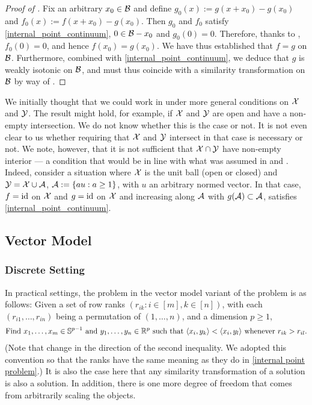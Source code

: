 \documentclass[twoside, 11pt]{article}
\begin{document}
\begin{proof}[Proof of ]
Fix an arbitrary $x_0 \in \mathcal{B}$ and define $g_0(x) := g(x+x_0)-g(x_0)$ and $f_0(x) := f(x+x_0)-g(x_0)$. Then $g_0$ and $f_0$ satisfy \eqref{internal_point_continuum}, $0 \in \mathcal{B} - x_0$ and $g_0(0) = 0$. Therefore, thanks to , $f_0(0) = 0$, and hence $f(x_0) = g(x_0)$. 
We have thus established that $f = g$ on $\mathcal{B}$. Furthermore, combined with \eqref{internal_point_continuum}, we deduce that $g$ is weakly isotonic on $\mathcal{B}$,  and must thus coincide with a similarity transformation on $\mathcal{B}$ by way of . 
\end{proof}

We initially thought that we could work in  under more general conditions on $\mathcal{X}$ and $\mathcal{Y}$. The result might hold, for example, if $\mathcal{X}$ and $\mathcal{Y}$ are open and have a non-empty intersection. We do not know whether this is the case or not. It is not even clear to us whether requiring that $\mathcal{X}$ and $\mathcal{Y}$ intersect in that case is necessary or not. 
We note, however, that it is not sufficient that $\mathcal{X} \cap \mathcal{Y}$ have non-empty interior --- a condition that would be in line with what was assumed in  and . Indeed, consider a situation where $\mathcal{X}$ is the unit ball (open or closed) and $\mathcal{Y} = \mathcal{X} \cup \mathcal{A}$, $\mathcal{A} := \{a u : a \ge 1\}$, with $u$ an arbitrary normed vector. In that case, $f = {\rm id}$ on $\mathcal{X}$ and $g = {\rm id}$ on $\mathcal{X}$ and increasing along $\mathcal{A}$ with $g(\mathcal{A}) \subset \mathcal{A}$, satisfies \eqref{internal_point_continuum}.



\subsection{Vector Model}
\label{sec:internal_vector}

\subsubsection{Discrete Setting}
\label{sec:internal vector discrete}

In practical settings, the problem in the vector model variant of the problem is as follows: 
Given a set of row ranks $(r_{ik} : i \in [m], k \in [n])$, with each $(r_{i1}, \dots, r_{in})$ being a permutation of $(1, \dots, n)$, and a dimension $p \ge 1$, 
\begin{equation}
\begin{gathered}
\text{Find $x_1, \dots, x_m \in \mathbb{S}^{p-1}$ and $y_1, \dots, y_n \in \mathbb{R}^p$ such that $\langle x_i, y_k\rangle < \langle x_i, y_l\rangle$ whenever $r_{ik} > r_{il}$.}
\end{gathered}
\end{equation}
(Note that change in the direction of the second inequality. We adopted this convention so that the ranks have the same meaning as they do in \eqref{internal point problem}.)
It is also the case here that any similarity transformation of a solution is also a solution. In addition, there is one more degree of freedom that comes from arbitrarily scaling the objects.
\end{document}
